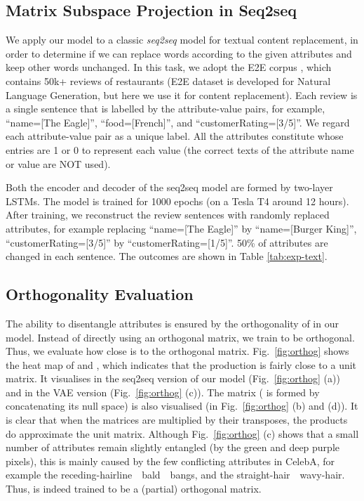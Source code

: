 \documentclass{article}
\begin{document}
\subsection{Matrix Subspace Projection in Seq2seq}



We apply our model to a classic \textit{seq2seq} model for textual content replacement, in order to determine if we can replace words according to the given attributes and keep other words unchanged.
In this task, we adopt the E2E corpus \cite{dusek2019e2e}, which contains 50k+ reviews of restaurants (E2E dataset is developed for Natural Language Generation, but here we use it for content replacement). Each review is a single sentence that is labelled by the attribute-value pairs, for example, ``name=[The Eagle]'', ``food=[French]'', and ``customerRating=[3/5]''. We regard each attribute-value pair as a unique label. All the attributes constitute  whose entries are 1 or 0 to represent each value  (the correct texts of the attribute name or value are NOT used).

Both the encoder and decoder of the seq2seq model are formed by two-layer LSTMs. The model is trained for 1000 epochs (on a Tesla T4 around 12 hours). After training, we reconstruct the review sentences with randomly replaced attributes, for example replacing ``name=[The Eagle]'' by ``name=[Burger King]'', ``customerRating=[3/5]'' by ``customerRating=[1/5]''. 50\% of attributes are changed in each sentence.
The outcomes are shown in Table \ref{tab:exp-text}.



\subsection{Orthogonality Evaluation} \label{sec:orthog}


The ability to disentangle attributes is ensured by the orthogonality of  in our model. Instead of directly using an orthogonal matrix, we train  to be orthogonal. Thus, we evaluate how close  is to the orthogonal matrix.
Fig.~\ref{fig:orthog} shows the heat map of  and , which indicates that the production is fairly close to a unit matrix. It visualises  in the seq2seq version of our model (Fig.~\ref{fig:orthog} (a)) and in the VAE version (Fig.~\ref{fig:orthog} (c)). The matrix  ( is formed by  concatenating its null space) is also visualised (in Fig.~\ref{fig:orthog} (b) and (d)). It is clear that when the matrices are multiplied by their transposes, the products do approximate the unit matrix.
Although Fig.~\ref{fig:orthog} (c) shows that a small number of attributes remain slightly entangled (by the green and deep purple pixels), this is mainly caused by the few conflicting attributes in CelebA, for example the receding-hairline~~bald~~bangs, and the straight-hair~~wavy-hair.
Thus,  is indeed trained to be a (partial) orthogonal matrix.  
\end{document}
